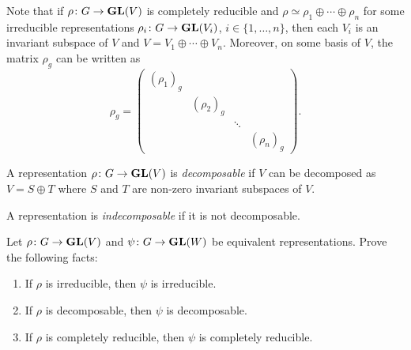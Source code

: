 Note that if $\rho\colon G\to\mathbf{GL}(V)$ is completely reducible and 
$\rho\simeq\rho_1\oplus\cdots\oplus \rho_n$ for some irreducible representations 
$\rho_i\colon G\to\mathbf{GL}(V_i)$, $i\in\{1,\dots,n\}$, then 
each $V_i$ is an invariant subspace of $V$ and $V=V_1\oplus \cdots \oplus V_n$. 
Moreover, on some basis of $V$, the matrix  
$\rho_g$ can be written as 
\[
\rho_g=\begin{pmatrix}
(\rho_1)_g &  \\
& (\rho_2)_g  \\
&&\ddots\\
&&&(\rho_n)_g	
\end{pmatrix}.
\]

\begin{definition}
A representation
$\rho\colon G\to\mathbf{GL}(V)$ is \emph{decomposable} if $V$ can be decomposed as $V=S\oplus T$
where $S$ and $T$ are non-zero invariant subspaces of $V$. 
\end{definition}

A representation is 
\emph{indecomposable} if it is not decomposable. 

\begin{exercise}
\label{xca:equivalence}
	Let $\rho\colon G\to\mathbf{GL}(V)$ and $\psi\colon G\to\mathbf{GL}(W)$ be equivalent representations.
	Prove the following facts:
	\begin{enumerate}
		\item If $\rho$ is irreducible, then $\psi$ is irreducible.
		\item If $\rho$ is decomposable, then $\psi$ is decomposable.
		\item If $\rho$ is completely reducible, then $\psi$ is completely reducible. 
	\end{enumerate}	
\end{exercise}


